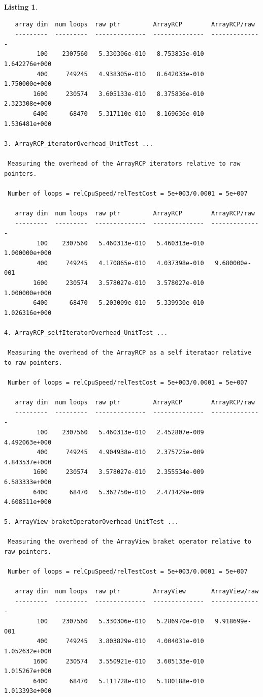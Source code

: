 \documentclass[pdf,ps2pdf,11pt]{SANDreport}
\newtheorem{listing}{Listing}
\begin{document}
\begin{listing}
{\begin{verbatim}
   array dim  num loops  raw ptr         ArrayRCP        ArrayRCP/raw  
   ---------  ---------  --------------  --------------  --------------
         100    2307560   5.330306e-010   8.753835e-010   1.642276e+000
         400     749245   4.938305e-010   8.642033e-010   1.750000e+000
        1600     230574   3.605133e-010   8.375836e-010   2.323308e+000
        6400      68470   5.317110e-010   8.169636e-010   1.536481e+000

3. ArrayRCP_iteratorOverhead_UnitTest ... 
 
 Measuring the overhead of the ArrayRCP iterators relative to raw pointers.
 
 Number of loops = relCpuSpeed/relTestCost = 5e+003/0.0001 = 5e+007
 
   array dim  num loops  raw ptr         ArrayRCP        ArrayRCP/raw  
   ---------  ---------  --------------  --------------  --------------
         100    2307560   5.460313e-010   5.460313e-010   1.000000e+000
         400     749245   4.170865e-010   4.037398e-010   9.680000e-001
        1600     230574   3.578027e-010   3.578027e-010   1.000000e+000
        6400      68470   5.203009e-010   5.339930e-010   1.026316e+000

4. ArrayRCP_selfIteratorOverhead_UnitTest ... 
 
 Measuring the overhead of the ArrayRCP as a self iterataor relative to raw pointers.
 
 Number of loops = relCpuSpeed/relTestCost = 5e+003/0.0001 = 5e+007
 
   array dim  num loops  raw ptr         ArrayRCP        ArrayRCP/raw  
   ---------  ---------  --------------  --------------  --------------
         100    2307560   5.460313e-010   2.452807e-009   4.492063e+000
         400     749245   4.904938e-010   2.375725e-009   4.843537e+000
        1600     230574   3.578027e-010   2.355534e-009   6.583333e+000
        6400      68470   5.362750e-010   2.471429e-009   4.608511e+000

5. ArrayView_braketOperatorOverhead_UnitTest ... 
 
 Measuring the overhead of the ArrayView braket operator relative to raw pointers.
 
 Number of loops = relCpuSpeed/relTestCost = 5e+003/0.0001 = 5e+007
 
   array dim  num loops  raw ptr         ArrayView       ArrayView/raw 
   ---------  ---------  --------------  --------------  --------------
         100    2307560   5.330306e-010   5.286970e-010   9.918699e-001
         400     749245   3.803829e-010   4.004031e-010   1.052632e+000
        1600     230574   3.550921e-010   3.605133e-010   1.015267e+000
        6400      68470   5.111728e-010   5.180188e-010   1.013393e+000


\end{verbatim}}
\end{listing}
\end{document}

